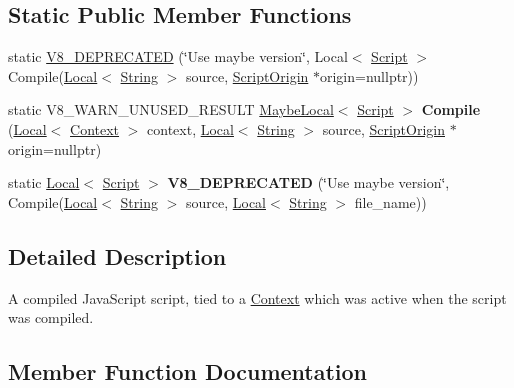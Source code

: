 \subsection*{Static Public Member Functions}
\begin{DoxyCompactItemize}
\item 
static \mbox{\hyperlink{classv8_1_1Script_a04d2ee2ca108f663cf32b32b87ae519c}{V8\+\_\+\+D\+E\+P\+R\+E\+C\+A\+T\+ED}} (\char`\"{}Use maybe version\char`\"{}, Local$<$ \mbox{\hyperlink{classv8_1_1Script}{Script}} $>$ Compile(\mbox{\hyperlink{classv8_1_1Local}{Local}}$<$ \mbox{\hyperlink{classv8_1_1String}{String}} $>$ source, \mbox{\hyperlink{classv8_1_1ScriptOrigin}{Script\+Origin}} $\ast$origin=nullptr))
\item 
\mbox{\label{classv8_1_1Script_a1793e3022a87f5a574df10bff8b42762}} 
static V8\+\_\+\+W\+A\+R\+N\+\_\+\+U\+N\+U\+S\+E\+D\+\_\+\+R\+E\+S\+U\+LT \mbox{\hyperlink{classv8_1_1MaybeLocal}{Maybe\+Local}}$<$ \mbox{\hyperlink{classv8_1_1Script}{Script}} $>$ {\bfseries Compile} (\mbox{\hyperlink{classv8_1_1Local}{Local}}$<$ \mbox{\hyperlink{classv8_1_1Context}{Context}} $>$ context, \mbox{\hyperlink{classv8_1_1Local}{Local}}$<$ \mbox{\hyperlink{classv8_1_1String}{String}} $>$ source, \mbox{\hyperlink{classv8_1_1ScriptOrigin}{Script\+Origin}} $\ast$origin=nullptr)
\item 
\mbox{\label{classv8_1_1Script_a6744d2490c455a2acea6f7266422921e}} 
static \mbox{\hyperlink{classv8_1_1Local}{Local}}$<$ \mbox{\hyperlink{classv8_1_1Script}{Script}} $>$ {\bfseries V8\+\_\+\+D\+E\+P\+R\+E\+C\+A\+T\+ED} (\char`\"{}Use maybe version\char`\"{}, Compile(\mbox{\hyperlink{classv8_1_1Local}{Local}}$<$ \mbox{\hyperlink{classv8_1_1String}{String}} $>$ source, \mbox{\hyperlink{classv8_1_1Local}{Local}}$<$ \mbox{\hyperlink{classv8_1_1String}{String}} $>$ file\+\_\+name))
\end{DoxyCompactItemize}


\subsection{Detailed Description}
A compiled Java\+Script script, tied to a \mbox{\hyperlink{classv8_1_1Context}{Context}} which was active when the script was compiled. 

\subsection{Member Function Documentation}
\mbox{\label{classv8_1_1Script_afac25cad452a61897c375c2b881e2070}} 
